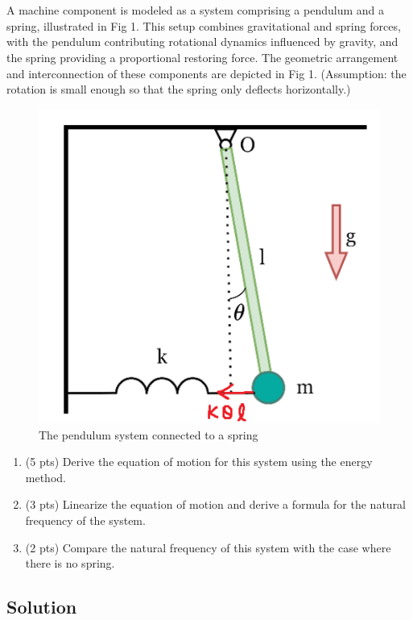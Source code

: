 \section{}
A machine component is modeled as a system comprising a pendulum and a spring, illustrated in 
Fig 1. This setup combines gravitational and spring forces, with the pendulum contributing 
rotational dynamics influenced by gravity, and the spring providing a proportional restoring force. 
The geometric arrangement and interconnection of these components are depicted in Fig 1. 
(Assumption: the rotation is small enough so that the spring only deflects horizontally.)

\begin{figure}[h]
    \centering
    \includegraphics[width=0.5\linewidth]{Questions/Figures/q3 problem diagram.png}
    \caption{The pendulum system connected to a spring}
    \label{fig:q3-png}
\end{figure}
\begin{enumerate}[label=(\alph*)]
    \item (5 pts) Derive the equation of motion for this system using the energy method.
    \item (3 pts) Linearize the equation of motion and derive a formula for the natural frequency of the 
        system.
    \item (2 pts) Compare the natural frequency of this system with the case where there is no spring.
\end{enumerate}

\subsection*{Solution}
